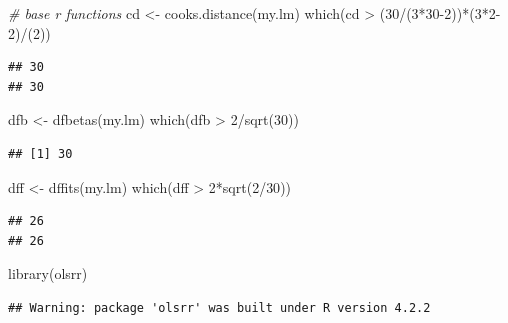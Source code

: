 \documentclass[
]{book}
\newenvironment{Shaded}{\begin{snugshade}}{\end{snugshade}}
\newcommand{\CommentTok}[1]{\textcolor[rgb]{0.56,0.35,0.01}{\textit{#1}}}
\newcommand{\DecValTok}[1]{\textcolor[rgb]{0.00,0.00,0.81}{#1}}
\newcommand{\FunctionTok}[1]{\textcolor[rgb]{0.00,0.00,0.00}{#1}}
\newcommand{\NormalTok}[1]{#1}
\newcommand{\OtherTok}[1]{\textcolor[rgb]{0.56,0.35,0.01}{#1}}
\newcommand{\SpecialCharTok}[1]{\textcolor[rgb]{0.00,0.00,0.00}{#1}}
\begin{document}
\begin{Shaded}
\begin{Highlighting}[]
\CommentTok{\# base r functions}
\NormalTok{cd }\OtherTok{\textless{}{-}} \FunctionTok{cooks.distance}\NormalTok{(my.lm)}
\FunctionTok{which}\NormalTok{(cd }\SpecialCharTok{\textgreater{}}\NormalTok{ (}\DecValTok{30}\SpecialCharTok{/}\NormalTok{(}\DecValTok{3}\SpecialCharTok{*}\DecValTok{30{-}2}\NormalTok{))}\SpecialCharTok{*}\NormalTok{(}\DecValTok{3}\SpecialCharTok{*}\DecValTok{2{-}2}\NormalTok{)}\SpecialCharTok{/}\NormalTok{(}\DecValTok{2}\NormalTok{))}
\end{Highlighting}
\end{Shaded}

\begin{verbatim}
## 30 
## 30
\end{verbatim}

\begin{Shaded}
\begin{Highlighting}[]
\NormalTok{dfb }\OtherTok{\textless{}{-}} \FunctionTok{dfbetas}\NormalTok{(my.lm)}
\FunctionTok{which}\NormalTok{(dfb }\SpecialCharTok{\textgreater{}} \DecValTok{2}\SpecialCharTok{/}\FunctionTok{sqrt}\NormalTok{(}\DecValTok{30}\NormalTok{))}
\end{Highlighting}
\end{Shaded}

\begin{verbatim}
## [1] 30
\end{verbatim}

\begin{Shaded}
\begin{Highlighting}[]
\NormalTok{dff }\OtherTok{\textless{}{-}} \FunctionTok{dffits}\NormalTok{(my.lm)}
\FunctionTok{which}\NormalTok{(dff }\SpecialCharTok{\textgreater{}} \DecValTok{2}\SpecialCharTok{*}\FunctionTok{sqrt}\NormalTok{(}\DecValTok{2}\SpecialCharTok{/}\DecValTok{30}\NormalTok{))}
\end{Highlighting}
\end{Shaded}

\begin{verbatim}
## 26 
## 26
\end{verbatim}

\begin{Shaded}
\begin{Highlighting}[]
\FunctionTok{library}\NormalTok{(olsrr)}
\end{Highlighting}
\end{Shaded}

\begin{verbatim}
## Warning: package 'olsrr' was built under R version 4.2.2
\end{verbatim}
\end{document}
